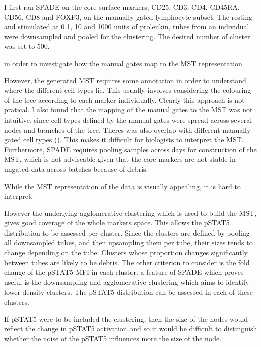 I first ran \gls{SPADE} on the core surface markers, CD25, CD3, CD4, CD45RA, CD56, CD8 and FOXP3,
on the manually gated lymphocyte subset.
The resting and stimulated at 0.1, 10 and 1000 units of proleukin,
tubes from an individual were downsampled and pooled for the clustering.
The desired number of cluster was set to 500.

in order to investigate how the manual gates map to the \gls{MST} representation.


However, the generated \gls{MST} requires some annotation in order to understand where the different cell types lie.
This usually involves considering the colouring of the tree according to each marker individually.
Clearly this approach is not pratical.
I also found that the mapping of the manual gates to the MST was not intuitive,
since cell types defined by the manual gates were spread across several nodes and branches of the tree.
Theres was also overlap with different manually gated cell types ().
This makes it difficult for biologists to interpret the \gls{MST}.
Furthermore, SPADE requires pooling samples across days for construction of the \gls{MST}, which is not adviseable given that the core
markers are not stable in ungated data across batches because of debris.

While the MST representation of the data is visually appealing, it is hard to interpret.

However the underlying agglomerative clustering which is used to build the MST, gives good coverage of the whole markers space.
This allows the pSTAT5 distribution to be assessed per cluster.
Since the clusters are defined by pooling all downsampled tubes, and then upsampling them per tube,
their sizes tends to change depending on the tube.
Clusters whose proportion changes significantly between tubes are likely to be debris.
The other criterion to consider is the fold change of the pSTAT5 MFI in each cluster.
a feature of SPADE which proves useful is the downsampling and agglomerative clustering which aims to identify lower density clusters.
The pSTAT5 distribution can be assessed in each of these clusters.

If pSTAT5 were to be included the clustering, then the size of the nodes would reflect the change in pSTAT5 activation and so it would be
difficult to distinguish whether the noise of the pSTAT5 influences more the size of the node.



